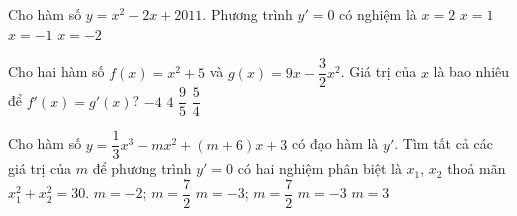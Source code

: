 \begin{ex}%
	Cho hàm số $y=x^2-2x+2011$. Phương trình $y'=0$  có nghiệm là
	\choice 
		{$x=2$} 
		{\True  $x=1$}
		{$x=-1$} 
		 {$x=-2$}
\end{ex}

\begin{ex}%
	Cho hai hàm số  $f(x)=x^2+5$ và $g(x)=9x-\dfrac{3}{2}x^2$. Giá trị của $x$ là bao nhiêu để $f'(x)=g'(x)$?
	 \choice
		 {$-4$}
		 {$4$}
		{\True $\dfrac{9}{5}$} 
		{$\dfrac{5}{4}$} 
\end{ex}

\begin{ex}%
	Cho hàm số $y=\dfrac{1}{3}x^3-mx^2+(m+6)x+3$ có đạo hàm là $y'$.  Tìm tất cả các giá trị của $m$ để phương trình $y'=0$ có hai nghiệm phân biệt là $x_1$, $x_2$ thoả mãn $x_1^2+x_2^2=30$.
	 \choice
		{$m=-2$; $m=\dfrac{7}{2}$} 
		{\True  $m=-3$; $m=\dfrac{7}{2}$}
		 {$m=-3$}
		 {$m=3$}
\end{ex}

